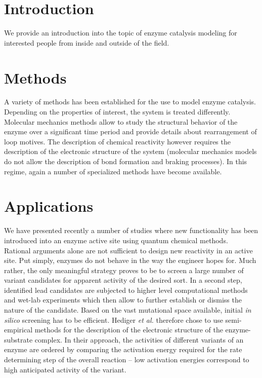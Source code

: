 \section{Introduction}\label{sec:intro}
We provide an introduction into the topic of enzyme catalysis modeling for interested people from inside and outside of the field.


\section{Methods}\label{sec:methods}
A variety of methods has been established for the use to model enzyme catalysis.
Depending on the properties of interest, the system is treated differently.
Molecular mechanics methods allow to study the structural behavior of the enzyme over a significant time period and provide details about rearrangement of loop motives.
The description of chemical reactivity however requires the description of the electronic structure of the system (molecular mechanics models do not allow the description of bond formation and braking processes).
In this regime, again a number of specialized methods have become available.


\section{Applications}\label{sec:apps}
We have presented recently a number of studies where new functionality has been introduced into an enzyme active site using quantum chemical methods\citep{10.1371/journal.pone.0049849,hediger2013silico,hediger2013computational}.\\
Rational arguments alone are not sufficient to design new reactivity in an active site.
Put simply, enzymes do not behave in the way the engineer hopes for.
Much rather, the only meaningful strategy proves to be to screen a large number of variant candidates for apparent activity of the desired sort.
In a second step, identified lead candidates are subjected to higher level computational methods and wet-lab experiments which then allow to further establish or dismiss the nature of the candidate.
Based on the vast mutational space available, initial \textit{in silico} screening has to be efficient.
Hediger \textit{et al.} therefore chose to use semi-empirical methods for the description of the electronic structure of the enzyme-substrate complex.
In their approach, the activities of different variants of an enzyme are ordered by comparing the activation energy required for the rate determining step of the overall reaction -- low activation energies correspond to high anticipated activity of the variant.
